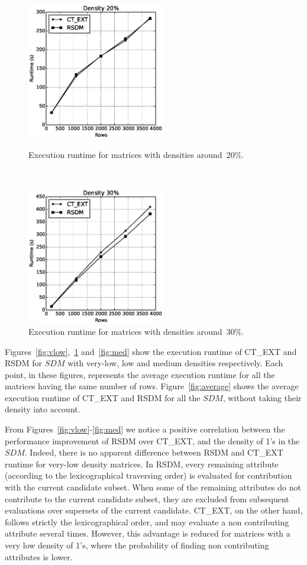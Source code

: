 \documentclass[authoryear,11pt]{elsarticle}
\begin{document}
	\begin{figure}[htb]
	\centering
	\begin{minipage}{.45\textwidth}
	  \centering
	   \includegraphics[width=6cm , height=6cm]{vlow_density.eps}
	  \caption{Execution runtime for matrices with densities around~20\%.}
	  \label{fig:vlow}
	\end{minipage}%
	~~~
	\begin{minipage}{.45\textwidth}
	  \centering
	   \includegraphics[width=6cm , height=6cm]{low_density1.eps}
	  \caption{Execution runtime for matrices with densities around~30\%.}
	  \label{fig:low}
	\end{minipage}
	\end{figure}
	
	Figures~\ref{fig:vlow},~\ref{fig:low} and~\ref{fig:med} show the execution runtime of CT\_EXT and RSDM for $SDM$ 
	with very-low, low and medium densities respectively. Each point, in these figures, represents the average
	execution runtime for all the matrices having the same number of rows. Figure~\ref{fig:average} shows the average 
	execution runtime of CT\_EXT and RSDM for all the $SDM$, without taking their density into account.
	
	From Figures~\ref{fig:vlow}-\ref{fig:med} we notice a positive correlation between the 
	performance improvement of RSDM over CT\_EXT, and the density of 1's in the $SDM$. Indeed, there is no apparent
	difference between RSDM and CT\_EXT runtime for very-low density matrices. In RSDM, every remaining attribute 
	(according to the lexicographical traversing order) is evaluated for contribution with the current candidate subset. 
	When some of the remaining attributes do not contribute to the current candidate subset, they are excluded from 
	subsequent evaluations over supersets of the current candidate. CT\_EXT, on the other hand, follows strictly the 
	lexicographical order, and may evaluate a non contributing attribute several times. However, this advantage is 
	reduced for matrices with a very low density of 1's, where the probability of finding non contributing attributes 
	is lower. 
	
\end{document}
